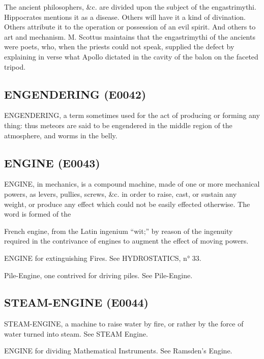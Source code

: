 \documentclass{article}
\begin{document}
The ancient philosophers, \&c. are divided upon the subject of the engastrimythi. Hippocrates mentions it as a disease. Others will have it a kind of divination. Others attribute it to the operation or possession of an evil spirit. And others to art and mechanism. M. Scottus maintains that the engastrimythi of the ancients were poets, who, when the priests could not speak, supplied the defect by explaining in verse what Apollo dictated in the cavity of the balon on the faceted tripod.

\subsection*{ENGENDERING (E0042)}
ENGENDERING, a term sometimes used for the act of producing or forming any thing: thus meteors are said to be engendered in the middle region of the atmosphere, and worms in the belly.

\subsection*{ENGINE (E0043)}
ENGINE, in mechanics, is a compound machine, made of one or more mechanical powers, as levers, pullies, screws, \&c. in order to raise, cast, or sustain any weight, or produce any effect which could not be easily effected otherwise. The word is formed of the

French engine, from the Latin ingenium “wit;” by reason of the ingenuity required in the contrivance of engines to augment the effect of moving powers.

ENGINE for extinguishing Fires. See HYDROSTATICS, n° 33.

Pile-Engine, one contrived for driving piles. See Pile-Engine.

\subsection*{STEAM-ENGINE (E0044)}
STEAM-ENGINE, a machine to raise water by fire, or rather by the force of water turned into steam. See STEAM Engine.

ENGINE for dividing Mathematical Instruments. See Ramsden's Engine.
\end{document}

